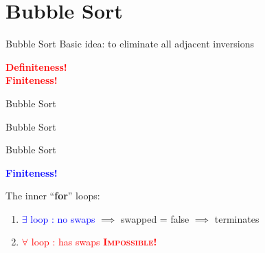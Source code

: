 \section{Bubble Sort}

\begin{frame}{Bubble Sort}
  Basic idea: to eliminate all adjacent inversions

  

  \pause

  \begin{center}
	\textcolor{red}{\bf Definiteness!}\\[0.30cm]
	\pause
	\textcolor{red}{\bf Finiteness!}
  \end{center}
\end{frame}
\begin{frame}{Bubble Sort}
  

\end{frame}
\begin{frame}{Bubble Sort}
  \begin{center}
  \end{center}

  \begin{center}
	
  \end{center}
\end{frame}
\begin{frame}{Bubble Sort}
  \begin{center}
  \end{center}

  \begin{center}
	\textcolor{blue}{\bf Finiteness!}
  \end{center}

  \pause

  The inner ``{\bf for}'' loops:
  \begin{enumerate}[1)]
	\item \textcolor{blue}{$\exists$ loop : no swaps} $\implies$ swapped = false $\implies$ terminates
	  \pause
	\item \textcolor{red}{$\forall$ loop : has swaps} \pause \qquad \textcolor{red}{\bf \textsc{Impossible}!}
  \end{enumerate}
\end{frame}
